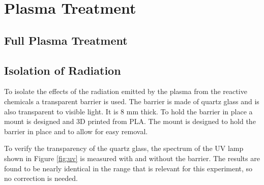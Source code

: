 \section{Plasma Treatment}

\subsection{Full Plasma Treatment}

\subsection{Isolation of Radiation}
To isolate the effects of the radiation emitted by the plasma from the reactive chemicals a transparent barrier is used. The barrier is made of quartz glass and is also transparent to visible light. It is 8 mm thick. To hold the barrier in place a mount is designed and 3D printed from PLA. The mount is designed to hold the barrier in place and to allow for easy removal.

To verify the transparency of the quartz glass, the spectrum of the UV lamp shown in Figure \ref{fig:uv} is measured with and without the barrier. The results are found to be nearly identical in the range that is relevant for this experiment, so no correction is needed. 


